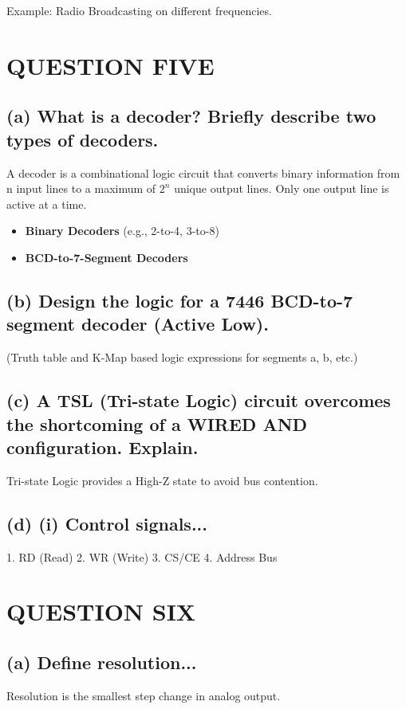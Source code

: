 \documentclass[11pt,a4paper]{article}
\begin{document}
Example: Radio Broadcasting on different frequencies.

\section*{QUESTION FIVE}

\subsection*{(a) What is a decoder? Briefly describe two types of decoders.}
A decoder is a combinational logic circuit that converts binary information from n input lines to a maximum of $2^n$ unique output lines. Only one output line is active at a time.

\begin{itemize}
    \item \textbf{Binary Decoders} (e.g., 2-to-4, 3-to-8)
    \item \textbf{BCD-to-7-Segment Decoders}
\end{itemize}

\subsection*{(b) Design the logic for a 7446 BCD-to-7 segment decoder (Active Low).}
(Truth table and K-Map based logic expressions for segments a, b, etc.)

\subsection*{(c) A TSL (Tri-state Logic) circuit overcomes the shortcoming of a WIRED AND configuration. Explain.}
Tri-state Logic provides a High-Z state to avoid bus contention.

\subsection*{(d) (i) Control signals...}
1. RD (Read) 2. WR (Write) 3. CS/CE 4. Address Bus

\section*{QUESTION SIX}

\subsection*{(a) Define resolution...}
Resolution is the smallest step change in analog output. 
\end{document}
